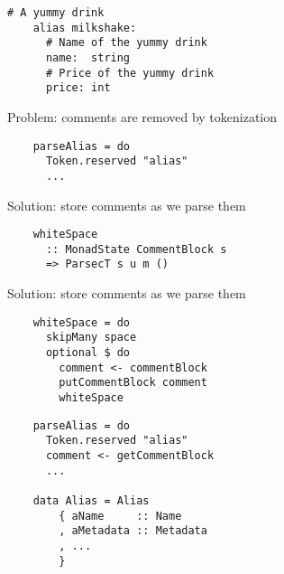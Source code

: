 \documentclass[20pt]{beamer}
\newcommand{\vspaced}{
    \vspace{5mm}
}
\newcommand{\imageframe}[1]{
    {
        \usebackgroundtemplate{
            \texttt{[image: \#1]}}
        \setbeamertemplate{navigation symbols}{}
        \begin{frame}[plain]
        \end{frame}
    }
}
\begin{document}
\imageframe{images/overview-docs.pdf}

\begin{frame}
    \begin{lstlisting}[keywords = {}]
    # A yummy drink
    alias milkshake:
      # Name of the yummy drink
      name:  string
      # Price of the yummy drink
      price: int
    \end{lstlisting}
\end{frame}

\begin{frame}
    Problem: comments are removed by tokenization \\
    \vspaced
    \begin{lstlisting}
    parseAlias = do
      Token.reserved "alias"
      ...
    \end{lstlisting}
\end{frame}

\begin{frame}
    Solution: store comments as we parse them \\
    \vspaced
    \begin{lstlisting}
    whiteSpace
      :: MonadState CommentBlock s
      => ParsecT s u m ()
    \end{lstlisting}
\end{frame}

\begin{frame}
    Solution: store comments as we parse them \\
    \vspaced
    \begin{lstlisting}
    whiteSpace = do
      skipMany space
      optional $ do
        comment <- commentBlock
        putCommentBlock comment
        whiteSpace
    \end{lstlisting}
\end{frame}

\begin{frame}
    \begin{lstlisting}
    parseAlias = do
      Token.reserved "alias"
      comment <- getCommentBlock
      ...

    data Alias = Alias
        { aName     :: Name
        , aMetadata :: Metadata
        , ...
        }
    \end{lstlisting}
\end{frame}


\begin{frame}[plain]
\end{frame}
\end{document}
